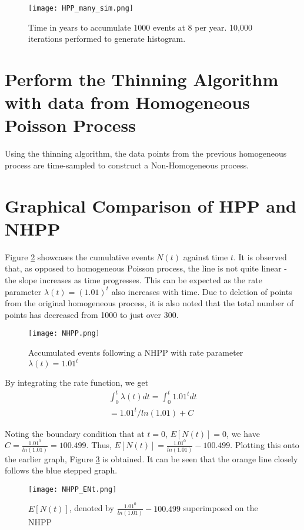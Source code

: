 \documentclass[%
 reprint,
 amsmath,amssymb,
 aps,
]{revtex4-2}
\theoremstyle{definition}
\begin{document}
\begin{figure}
\centering
\texttt{[image: HPP\_many\_sim.png]}
\caption{\label{fig:hpp_many_sim}Time in years to accumulate 1000 events at 8 per year. 10,000 iterations performed to generate histogram.}
\end{figure}

\section{\label{q:5}Perform the Thinning Algorithm with data from Homogeneous Poisson Process}
Using the thinning algorithm, the data points from the previous homogeneous process are time-sampled to construct a Non-Homogeneous process. 

\section{\label{q:6}Graphical Comparison of HPP and NHPP}
Figure \ref{fig:nhpp} showcases the cumulative events $N(t)$ against time $t$. It is observed that, as opposed to homogeneous Poisson process, the line is not quite linear - the slope increases as time progresses. This can be expected as the rate parameter $\lambda(t) = (1.01)^t$ also increases with time. Due to deletion of points from the original homogeneous process, it is also noted that the total number of points has decreased from 1000 to just over 300.

\begin{figure}
\centering
\texttt{[image: NHPP.png]}
\caption{\label{fig:nhpp}Accumulated events following a NHPP with rate parameter $\lambda(t) = 1.01^t$}
\end{figure}

By integrating the rate function, we get 
\begin{gather*}
\int_{0}^{t}\lambda(t)dt = \int_{0}^{t}1.01^tdt\\
=1.01^t/ln(1.01) + C
\end{gather*}

Noting the boundary condition that at $t=0$, $E[N(t)]=0$, we have $C = \frac{1.01^0}{ln(1.01)} = 100.499$. Thus,  $E[N(t)] = \frac{1.01^0}{ln(1.01)} - 100.499$. Plotting this onto the earlier graph, Figure \ref{fig:nhppent} is obtained. It can be seen that the orange line closely follows the blue stepped graph.

\begin{figure}
\centering
\texttt{[image: NHPP\_ENt.png]}
\caption{\label{fig:nhppent}$E[N(t)]$, denoted by $\frac{1.01^0}{ln(1.01)} - 100.499$ superimposed on the NHPP}
\end{figure}
\end{document}
